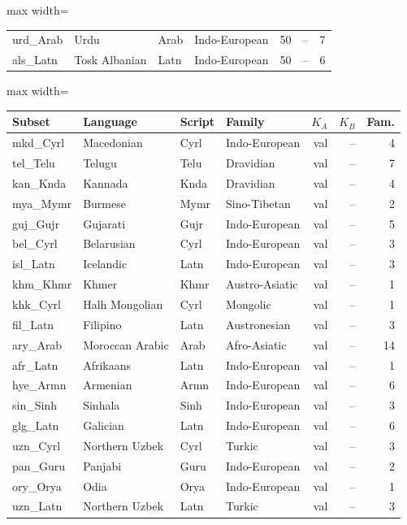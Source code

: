 \begin{table}[p]
\begin{minipage}[t]{0.49\textwidth}
\begin{adjustbox}{max width=\linewidth}
\begin{tabular}[t]{llllrrr}
urd\_Arab & Urdu & Arab & Indo-European & 50 & -- & 7 \\
als\_Latn & Tosk Albanian & Latn & Indo-European & 50 & -- & 6 \\
\bottomrule
\end{tabular}
\end{adjustbox}
\end{minipage}\hfill
\begin{minipage}[t]{0.49\textwidth}\centering
\begin{adjustbox}{max width=\linewidth}
\begin{tabular}[t]{llllrrr}
\toprule
Subset & Language & Script & Family & $K_A$ & $K_B$ & Fam. \\
\midrule
mkd\_Cyrl & Macedonian & Cyrl & Indo-European & val & -- & 4 \\
tel\_Telu & Telugu & Telu & Dravidian & val & -- & 7 \\
kan\_Knda & Kannada & Knda & Dravidian & val & -- & 4 \\
mya\_Mymr & Burmese & Mymr & Sino-Tibetan & val & -- & 2 \\
guj\_Gujr & Gujarati & Gujr & Indo-European & val & -- & 5 \\
bel\_Cyrl & Belarusian & Cyrl & Indo-European & val & -- & 3 \\
isl\_Latn & Icelandic & Latn & Indo-European & val & -- & 3 \\
khm\_Khmr & Khmer & Khmr & Austro-Asiatic & val & -- & 1 \\
khk\_Cyrl & Halh Mongolian & Cyrl & Mongolic & val & -- & 1 \\
fil\_Latn & Filipino & Latn & Austronesian & val & -- & 3 \\
ary\_Arab & Moroccan Arabic & Arab & Afro-Asiatic & val & -- & 14 \\
afr\_Latn & Afrikaans & Latn & Indo-European & val & -- & 1 \\
hye\_Armn & Armenian & Armn & Indo-European & val & -- & 6 \\
sin\_Sinh & Sinhala & Sinh & Indo-European & val & -- & 3 \\
glg\_Latn & Galician & Latn & Indo-European & val & -- & 6 \\
uzn\_Cyrl & Northern Uzbek & Cyrl & Turkic & val & -- & 3 \\
pan\_Guru & Panjabi & Guru & Indo-European & val & -- & 2 \\
ory\_Orya & Odia & Orya & Indo-European & val & -- & 1 \\
uzn\_Latn & Northern Uzbek & Latn & Turkic & val & -- & 3 \\

\end{tabular}
\end{adjustbox}
\end{minipage}
\end{table}
